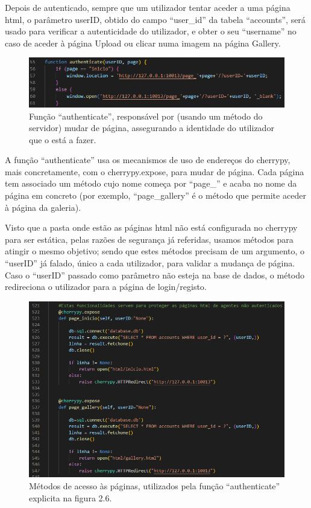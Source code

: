 \documentclass{report}
\begin{document}
 Depois de autenticado, sempre que um utilizador tentar aceder a uma página html, o parâmetro userID, obtido do campo “user\_id” da tabela “accounts”, será usado para verificar a autenticidade do utilizador, e obter o seu “username” no caso de aceder à página Upload ou clicar numa imagem na página Gallery.

\begin{figure}[!hbtp]

        \includegraphics[scale=0.80]{Images_code/8 - js authenticate.png}
        \caption{\label{Estrutura}Função “authenticate”, responsável por (usando um método do servidor) mudar de página, assegurando a identidade do utilizador que o está a fazer. }
\end{figure}

\newpage


 A função “authenticate” usa os mecanismos de uso de endereços do cherrypy, mais concretamente, com o cherrypy.expose, para mudar de página. Cada página tem associado um método cujo nome começa por “page\_” e acaba no nome da página em concreto (por exemplo, “page\_gallery” é o método que permite aceder à página da galeria).

\linebreak
\bigskip
 
	Visto que a pasta onde estão as páginas html não está configurada no cherrypy para ser estática, pelas razões de segurança já referidas, usamos métodos para atingir o mesmo objetivo; sendo que estes métodos precisam de um argumento, o “userID” já falado, único a cada utilizador, para validar a mudança de página. Caso o “userID” passado como parâmetro não esteja na base de dados, o método redireciona o utilizador para a página de login/registo.

\begin{figure}[!hbtp]

        \includegraphics[scale=0.60]{Images_code/9 - app paginas.png}
        \caption{\label{Estrutura}Métodos de acesso às páginas, utilizados pela função “authenticate” explicita na figura 2.6.}
\end{figure}
\end{document}
